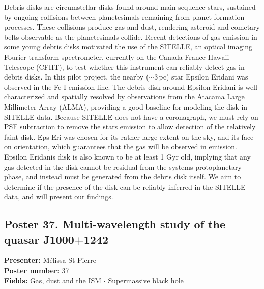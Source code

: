 Debris disks are circumstellar disks found around main sequence stars, sustained by ongoing collisions between planetesimals remaining from planet formation processes. These collisions produce gas and dust, rendering asteroid and cometary belts observable as the planetesimals collide. Recent detections of gas emission in some young debris disks motivated the use of the SITELLE, an optical imaging Fourier transform spectrometer, currently on the Canada France Hawaii Telescope (CFHT), to test whether this instrument can reliably detect gas in debris disks. In this pilot project, the nearby ($\sim$3\,pc) star Epsilon Eridani was observed in the Fe I emission line. The debris disk around Epsilon Eridani is well-characterized and spatially resolved by observations from the Atacama Large Millimeter Array (ALMA), providing a good baseline for modeling the disk in SITELLE data. Because SITELLE does not have a coronagraph, we must rely on PSF subtraction to remove the stars emission to allow detection of the relatively faint disk. Eps Eri was chosen for its rather large extent on the sky, and its face-on orientation, which guarantees that the gas will be observed in emission. Epsilon Eridanis disk is also known to be at least 1 Gyr old, implying that any gas detected in the disk cannot be residual from the systems protoplanetary phase, and instead must be generated from the debris disk itself. We aim to determine if the presence of the disk can be reliably inferred in the SITELLE data, and will present our findings.

\hypertarget{poster-abstract-talk-15}{}\label{poster-abstract-page-talk-15}
\subsection*{Poster 37. Multi-wavelength study of the quasar J1000+1242}
\textbf{Presenter:} Mélissa St-Pierre\\
\textbf{Poster number:} 37\\
\textbf{Fields:} Gas, dust and the ISM $\cdot$ Supermassive black hole

